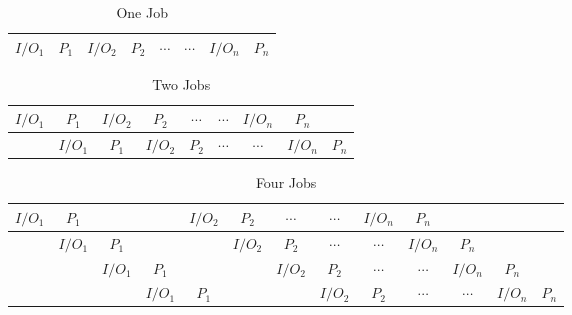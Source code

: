 \documentclass[12pt]{article}
\begin{document}
\begin{table}[h]
    \begin{tabular}{|c|c|c|c|c|c|c|c|}
    \hline
    $I/O_1$ & $P_1$ & $I/O_2$ & $P_2$ & $\cdots$ & $\cdots$ & $I/O_n$ & $P_n$ \\ \hline
    \end{tabular}
    \caption {One Job}
\end{table}

\begin{table}[h]
    \begin{tabular}{|c|c|c|c|c|c|c|c|c|}
    \hline
    $I/O_1$ & $P_1$   & $I/O_2$ & $P_2$   & $\cdots$ & $\cdots$ & $I/O_n$      & $P_n$   & ~ \\ \hline
    ~   & $I/O_1$ & $P_1$   & $I/O_2$ & $P_2$        & $\cdots$ & $\cdots$ & $I/O_n$ & $P_n$ \\ \hline
    \end{tabular}
    \caption {Two Jobs}
\end{table}
		
\begin{table}[h]
    \begin{tabular}{|c|c|c|c|c|c|c|c|c|c|c|c|c|}
    \hline
    $I/O_1$ & $P_1$   & ~     & ~     & $I/O_2$ & $P_2$   & $\cdots$ & $\cdots$ & $I/O_n$    & $P_n$      & ~        & ~     & ~   \\ \hline
    ~     & $I/O_1$ & $P_1$   & ~     & ~     & $I/O_2$ & $P_2$      & $\cdots$ & $\cdots$ & $I/O_n$    & $P_n$      & ~     & ~   \\ \hline
    ~     & ~     & $I/O_1$ & $P_1$   & ~     & ~     & $I/O_2$    & $P_2$      & $\cdots$ & $\cdots$ & $I/O_n$    & $P_n$   & ~   \\ \hline
    ~     & ~     & ~     & $I/O_1$ & $P_1$   & ~     & ~        & $I/O_2$    & $P_2$      & $\cdots$ & $\cdots$ & $I/O_n$ & $P_n$ \\ \hline
    \end{tabular}
    \caption {Four Jobs}
\end{table}		
\end{document}
